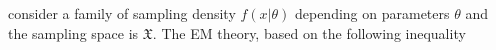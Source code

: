 
consider a family of sampling density $f(x|\theta)$ depending on parameters $\theta$ and the sampling space is $\mathfrak{X}$. 
The EM theory, based on the following inequality
